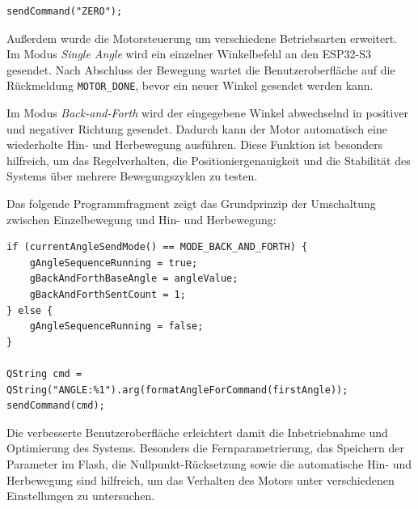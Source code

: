 \documentclass[a4paper,12pt]{article}
\begin{document}
\begin{verbatim}
sendCommand("ZERO");
\end{verbatim}

Außerdem wurde die Motorsteuerung um verschiedene Betriebsarten erweitert. Im Modus \textit{Single Angle} wird ein einzelner Winkelbefehl an den ESP32-S3 gesendet. Nach Abschluss der Bewegung wartet die Benutzeroberfläche auf die Rückmeldung \texttt{MOTOR\_DONE}, bevor ein neuer Winkel gesendet werden kann.

Im Modus \textit{Back-and-Forth} wird der eingegebene Winkel abwechselnd in positiver und negativer Richtung gesendet. Dadurch kann der Motor automatisch eine wiederholte Hin- und Herbewegung ausführen. Diese Funktion ist besonders hilfreich, um das Regelverhalten, die Positioniergenauigkeit und die Stabilität des Systems über mehrere Bewegungszyklen zu testen.

Das folgende Programmfragment zeigt das Grundprinzip der Umschaltung zwischen Einzelbewegung und Hin- und Herbewegung:

\begin{verbatim}
if (currentAngleSendMode() == MODE_BACK_AND_FORTH) {
    gAngleSequenceRunning = true;
    gBackAndForthBaseAngle = angleValue;
    gBackAndForthSentCount = 1;
} else {
    gAngleSequenceRunning = false;
}

QString cmd = QString("ANGLE:%1").arg(formatAngleForCommand(firstAngle));
sendCommand(cmd);
\end{verbatim}

Die verbesserte Benutzeroberfläche erleichtert damit die Inbetriebnahme und Optimierung des Systems. Besonders die Fernparametrierung, das Speichern der Parameter im Flash, die Nullpunkt-Rücksetzung sowie die automatische Hin- und Herbewegung sind hilfreich, um das Verhalten des Motors unter verschiedenen Einstellungen zu untersuchen.
\end{document}
